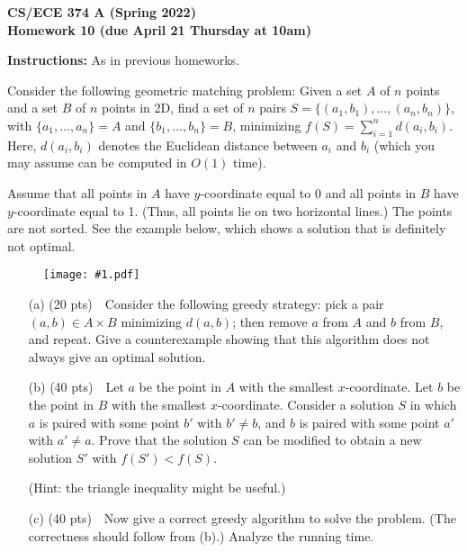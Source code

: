 \documentclass[11pt]{article}
\newcommand{\fig}[2]{\begin{figure}[h]\begin{center}%
  \texttt{[image: \#1.pdf]}\end{center}%
  \end{figure}}
\begin{document}
\begin{center}\Large\bf 
CS/ECE 374 A (Spring 2022)\\
{\Large Homework 10} (due April 21 Thursday at 10am)
\end{center}

\medskip
\noindent
{\bf Instructions:} As in previous homeworks.  


\begin{description}
\bigskip
\item[Problem 10.1:]  
Consider the following geometric matching problem: Given a set
$A$ of $n$ points and a set $B$ of $n$ points in 2D, find a set of $n$ pairs
$S=\{(a_1,b_1),\ldots, (a_n,b_n)\}$, with $\{a_1,\ldots, a_n\}=A$ and
$\{b_1,\ldots, b_n\}=B$, minimizing $f(S)=\sum_{i=1}^n d(a_i,b_i)$.
Here, $d(a_i,b_i)$ denotes the Euclidean distance between $a_i$
and $b_i$ (which you may assume can be computed in $O(1)$ time).

Assume that all points in $A$ have $y$-coordinate equal to 0
and all points in $B$ have $y$-coordinate equal to 1.
(Thus, all points lie on two horizontal lines.)  The points are not sorted.
See the example below, which shows a solution that is definitely not optimal.

\fig{hw10fig1}{0.8}

\vspace{-3ex}
\begin{enumerate}
\item[(a)] (20 pts)\ \ Consider the following greedy strategy:
pick a pair $(a,b)\in A\times B$ minimizing $d(a,b)$;
then remove $a$ from $A$ and $b$ from $B$, and repeat. 
Give a counterexample showing that this algorithm does not always give
an optimal solution.

\smallskip
\item[(b)] (40 pts)\ \ Let $a$ be the point in $A$ with the smallest $x$-coordinate.
Let $b$ be the point in $B$ with the smallest $x$-coordinate.
Consider a solution $S$ in which $a$ is paired with some point $b'$ with $b'\neq b$, and $b$
is paired with some point $a'$ with $a'\neq a$.
Prove that the solution $S$ can be modified to obtain a new solution $S'$ with $f(S')<f(S)$.

(Hint: the triangle inequality might be useful.)

\smallskip
\item[(c)] (40 pts)\ \ Now give a correct greedy algorithm to solve the problem.  (The correctness
should follow from (b).)  Analyze the running time.
\end{enumerate}







\end{description}
\end{document}
